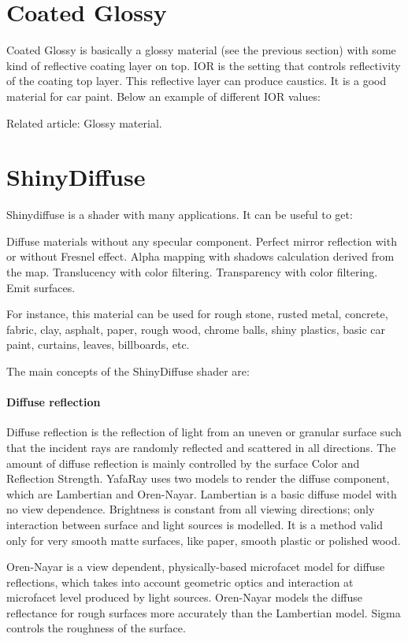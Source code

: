 \section{Coated Glossy}

Coated Glossy is basically a glossy material (see the previous section) with some kind of reflective coating layer on top. IOR is the setting that controls reflectivity of the coating top layer. This reflective layer can produce caustics. It is a good material for car paint. Below an example of different IOR values:

Related article: Glossy material.

\section{ShinyDiffuse}

Shinydiffuse is a shader with many applications. It can be useful to get:

Diffuse materials without any specular component.
Perfect mirror reflection with or without Fresnel effect.
Alpha mapping with shadows calculation derived from the map.
Translucency with color filtering.
Transparency with color filtering.
Emit surfaces.

For instance, this material can be used for rough stone, rusted metal, concrete, fabric, clay, asphalt, paper, rough wood, chrome balls, shiny plastics, basic car paint, curtains, leaves, billboards, etc.

The main concepts of the ShinyDiffuse shader are:



\paragraph{Diffuse reflection}

Diffuse reflection is the reflection of light from an uneven or granular surface such that the incident rays are randomly reflected and scattered in all directions. The amount of diffuse reflection is mainly controlled by the surface Color and Reflection Strength. YafaRay uses two models to render the diffuse component, which are Lambertian and Oren-Nayar.
Lambertian is a basic diffuse model with no view dependence. Brightness is constant from all viewing directions; only interaction between surface and light sources is modelled. It is a method valid only for very smooth matte surfaces, like paper, smooth plastic or polished wood.

Oren-Nayar is a view dependent, physically-based microfacet model for diffuse reflections, which takes into account geometric optics and interaction at microfacet level produced by light sources. Oren-Nayar models the diffuse reflectance for rough surfaces more accurately than the Lambertian model. Sigma controls the roughness of the surface.

